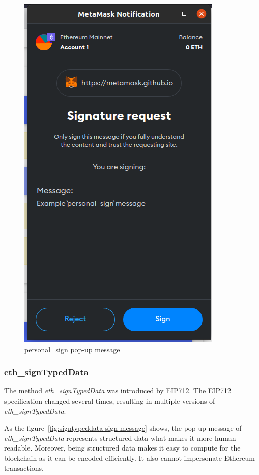 \documentclass{iitFirstPage}
\begin{document}
    \begin{figure}[H]
        \centering
        \includegraphics[width=0.49 \linewidth]{signature/personal_sign_message}
        \caption{personal\_sign pop-up message}
        \label{fig:personal-sign-message}
    \end{figure}

    \clearpage

    \subsubsection{eth\_signTypedData}

    The method \textit{eth\_signTypedData} was introduced by EIP712.
    The EIP712 specification changed several times, resulting in multiple versions of \textit{eth\_signTypedData}.

    As the figure~\ref{fig:signtypeddata-sign-message} shows, the pop-up message of \textit{eth\_signTypedData} represents structured data what makes it more human readable.
    Moreover, being structured data makes it easy to compute for the blockchain as it can be encoded efficiently.
    It also cannot impersonate Ethereum transactions.
\end{document}
